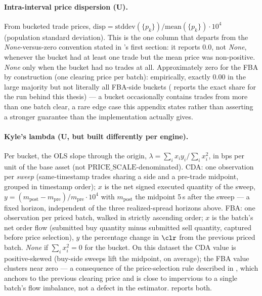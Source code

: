 \paragraph{Intra-interval price dispersion (U).}
From bucketed trade prices, $\mathrm{disp} =
\mathrm{stddev}(\{p_k\})/\mathrm{mean}(\{p_k\}) \cdot 10^{4}$ (population
standard deviation). This is the one column that departs from the
\emph{None}-versus-zero convention stated in 's first
section: it reports $0.0$, not \emph{None}, whenever the bucket had at
least one trade but the mean price was non-positive. \emph{None} only
when the bucket had no trades at all. Approximately zero for the FBA by
construction (one clearing price per batch): empirically, exactly $0.00$
in the large majority but not literally all FBA-side buckets
( reports the exact share for the run behind this
thesis) --- a bucket occasionally contains trades from more than one
batch clear, a rare edge case this appendix states rather than asserting
a stronger guarantee than the implementation actually gives.

\paragraph{Kyle's lambda (U, but built differently per engine).} Per
bucket, the OLS slope through the origin, $\lambda = \sum_i x_i
y_i/\sum_i x_i^2$, in bps per unit of the base asset (not
$\mathrm{PRICE\_SCALE}$-denominated). CDA: one observation per
\emph{sweep} (same-timestamp trades sharing a side and a pre-trade
midpoint, grouped in timestamp order); $x$ is the net signed executed
quantity of the sweep, $y = (m_{\mathrm{post}}-m_{\mathrm{pre}})/
m_{\mathrm{pre}} \cdot 10^{4}$ with $m_{\mathrm{post}}$ the midpoint
5\,s after the sweep --- a fixed horizon, independent of the three
realized-spread horizons above. FBA: one observation per priced batch,
walked in strictly ascending order; $x$ is the batch's net order flow
(submitted buy quantity minus submitted sell quantity, captured before
price selection), $y$ the percentage change in $\clr$ from the previous
priced batch. \emph{None} if $\sum_i x_i^2 = 0$ for the bucket. On this
dataset the CDA value is positive-skewed (buy-side sweeps lift the
midpoint, on average); the FBA value clusters near zero --- a
consequence of the price-selection rule described in
, which anchors to the previous clearing price and
is close to impervious to a single batch's flow imbalance, not a defect
in the estimator.  reports both.

